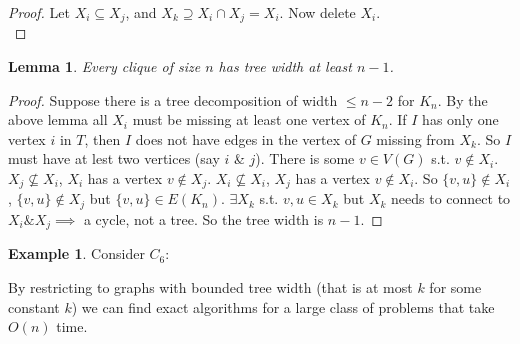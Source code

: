 \documentclass{article}
\newtheorem*{lem}{Lemma}
\theoremstyle{definition}
\newtheorem*{ex}{Example}
\begin{document}
\begin{proof}
Let $X_i\subseteq X_j$, and $X_k\supseteq X_i\cap X_j = X_i$.
Now delete $X_i$. \\
\end{proof}

\begin{lem}
Every clique of size $n$ has tree width at least $n-1$.
\end{lem}

\begin{proof}
Suppose there is a tree decomposition of width $\le n-2$ for $K_n$.
By the above lemma all $X_i$ must be missing at least one vertex of $K_n$.
If $I$ has only one vertex $i$ in $T$, then $I$ does not have edges in the vertex of $G$ missing from $X_k$.
So $I$ must have at lest two vertices (say $i$ \& $j$).
There is some $v\in V(G)$ s.t. $v\not\in X_i$.
$X_j \not\subseteq X_i$, $X_i$ has a vertex $v\not\in X_j$.
$X_i \not\subseteq X_i$, $X_j$ has a vertex $v\not\in X_i$.
So $\{v,u\} \not\in X_i$, $\{v,u\} \not\in X_j$ but $\{v,u\}\in E(K_n)$.
$\exists X_k$ s.t. $v,u\in X_k$ but $X_k$ needs to connect to $X_i \& X_j \implies $ a cycle, not a tree.
So the tree width is $n-1$. %
\end{proof}

\begin{ex}
Consider $C_6$:
\begin{center}
\end{center}
\end{ex}

By restricting to graphs with bounded tree width (that is at most $k$ for some constant $k$) we can find exact algorithms for a large class of problems that take $O(n)$ time.
\end{document}
